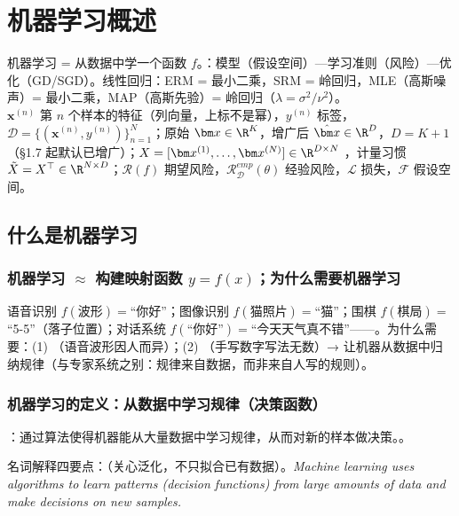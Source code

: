 \chapter{机器学习概述}
\noindent{}\quad 机器学习 = 从数据中学一个函数 $f$。：模型（假设空间）—学习准则（风险）—优化（GD/SGD）。线性回归：ERM = 最小二乘，SRM = 岭回归，MLE（高斯噪声）= 最小二乘，MAP（高斯先验）= 岭回归（$\lambda=\sigma^2/\nu^2$）。\\
\quad $\bm x^{(n)}$ 第 $n$ 个样本的特征（列向量，上标不是幂），$y^{(n)}$ 标签，$\mathcal D=\{(\bm x^{(n)},y^{(n)})\}_{n=1}^N$；原始 $\bm x\in\R^K$，增广后 $\hat{\bm x}\in\R^D$，$D=K+1$（§1.7 起默认已增广）；$X=[\bm x^{(1)},\dots,\bm x^{(N)}]\in\R^{D\times N}$ ，计量习惯 $\tilde X=X^\top\in\R^{N\times D}$；$\mathcal R(f)$ 期望风险，$\mathcal R^{emp}_{\mathcal D}(\theta)$ 经验风险，$\mathcal L$ 损失，$\mathcal F$ 假设空间。

\section{什么是机器学习}

\subsection{机器学习 \texorpdfstring{$\approx$}{≈} 构建映射函数 \texorpdfstring{$y=f(x)$}{y=f(x)}；为什么需要机器学习}
语音识别 $f(\text{波形})=$“你好”；图像识别 $f(\text{猫照片})=$“猫”；围棋 $f(\text{棋局})=$“5-5”（落子位置）；对话系统 $f(\text{“你好”})=$“今天天气真不错”——。为什么需要：(1) （语音波形因人而异）；(2) （手写数字写法无数）→ 让机器从数据中归纳规律（与专家系统之别：规律来自数据，而非来自人写的规则）。

\subsection{机器学习的定义：从数据中学习规律（决策函数）}
\begin{defn}[机器学习]
：通过算法使得机器能从大量数据中学习规律，从而对新的样本做决策。。
\end{defn}
名词解释四要点：（关心泛化，不只拟合已有数据）。\textit{Machine learning uses algorithms to learn patterns (decision functions) from large amounts of data and make decisions on new samples.}

